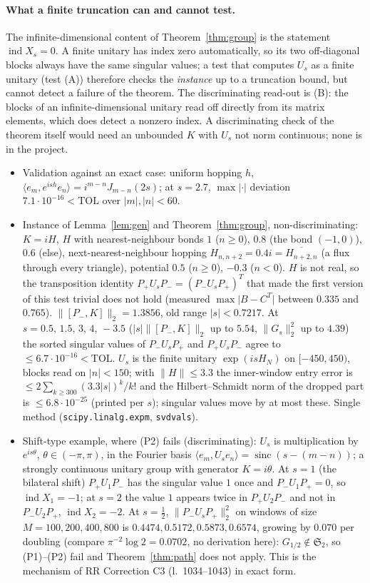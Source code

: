 \documentclass[11pt]{article}
\newcommand{\Stwo}{\mathfrak S_2}
\newcommand{\Pp}{P_+}\newcommand{\Pm}{P_-}
\newcommand{\norm}[1]{\lVert#1\rVert}
\newcommand{\abs}[1]{\lvert#1\rvert}
\newcommand{\ip}[2]{\langle#1,#2\rangle}
\newcommand{\ind}{\operatorname{ind}}
\begin{document}
\paragraph{What a finite truncation can and cannot test.}  The infinite-dimensional content of
Theorem~\ref{thm:group} is the statement $\ind X_s=0$.  A finite unitary has index zero automatically, so its two
off-diagonal blocks always have the same singular values; a test that computes $U_s$ as a finite unitary
(test (A)) therefore checks the \emph{instance} up to a truncation bound, but cannot detect a failure of the
theorem.  The discriminating read-out is (B): the blocks of an infinite-dimensional unitary read off directly from its
matrix elements, which does detect a nonzero index.  A discriminating check of the theorem itself would need an
unbounded $K$ with $U_s$ not norm continuous; none is in the project.
\begin{itemize}
\item[(0)] Validation against an exact case: uniform hopping $h$, $\ip{e_m}{e^{ish}e_n}=i^{m-n}J_{m-n}(2s)$; at $s=2.7$,
 $\max\abs{\cdot}$ deviation $7.1\cdot10^{-16}<\mathrm{TOL}$ over $\abs m,\abs n<60$.
\item[(A)] Instance of Lemma~\ref{lem:gen} and Theorem~\ref{thm:group}, non-discriminating: $K=iH$, $H$ with
 nearest-neighbour bonds $1$ ($n\ge0$), $0.8$ (the bond $(-1,0)$), $0.6$ (else), next-nearest-neighbour hopping
 $H_{n,n+2}=0.4i=\overline{H_{n+2,n}}$ (a flux through every triangle), potential $0.5$ ($n\ge0$), $-0.3$ ($n<0$).
 $H$ is not real, so the transposition identity $\Pp U_s\Pm=(\Pm U_s\Pp)^T$ that made the first version of this test
 trivial does not hold (measured $\max\abs{B-C^T}$ between $0.335$ and $0.765$).  $\norm{[\Pm,K]}_2=1.3856$, old range
 $\abs s<0.7217$.  At $s=0.5,\,1.5,\,3,\,4,\,-3.5$ ($\abs s\norm{[\Pm,K]}_2$ up to $5.54$, $\norm{G_s}_2^2$ up to $4.39$)
 the sorted singular values of $\Pm U_s\Pp$ and $\Pp U_s\Pm$ agree to $\le6.7\cdot10^{-16}<\mathrm{TOL}$.
 $U_s$ is the finite unitary $\exp(isH_N)$ on $[-450,450)$, blocks read on $\abs n<150$; with $\norm H\le3.3$ the
 inner-window entry error is $\le2\sum_{k\ge300}(3.3\abs s)^k/k!$ and the Hilbert--Schmidt norm of the dropped part
 is $\le6.8\cdot10^{-25}$ (printed per $s$); singular values move by at most these.  Single method
 (\texttt{scipy.linalg.expm}, \texttt{svdvals}).
\item[(B)] Shift-type example, where (P2) fails (discriminating): $U_s$ is multiplication by $e^{is\theta}$,
 $\theta\in(-\pi,\pi)$, in the Fourier basis $\ip{e_m}{U_se_n}=\operatorname{sinc}(s-(m-n))$; a strongly continuous
 unitary group with generator $K=i\theta$.  At $s=1$ (the bilateral shift) $\Pp U_1\Pm$ has the singular value $1$ once
 and $\Pm U_1\Pp=0$, so $\ind X_1=-1$; at $s=2$ the value $1$ appears twice in $\Pp U_2\Pm$ and not in $\Pm U_2\Pp$,
 $\ind X_2=-2$.  At $s=\frac12$, $\norm{\Pm U_s\Pp}_2^2$ on windows of size $M=100,200,400,800$ is
 $0.4474,0.5172,0.5873,0.6574$, growing by $0.070$ per doubling (compare $\pi^{-2}\log2=0.0702$, no derivation here):
 $G_{1/2}\notin\Stwo$, so (P1)--(P2) fail and Theorem~\ref{thm:path} does not apply.  This is the mechanism of RR
 Correction C3 (l.~1034--1043) in exact form.
\end{itemize}
\end{document}
